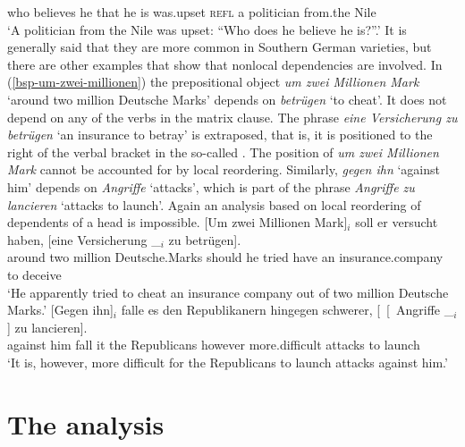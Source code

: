      \hphantom{"`}who believes he that he {} is was.upset \textsc{refl} a politician from.the Nile\\
\glt `A politician from the Nile was upset: ``Who does he believe he is?''.'
\zl
It is generally said that they are more common in Southern German varieties, but there are other
examples that show that nonlocal dependencies are involved. In (\ref{bsp-um-zwei-millionen}) the
prepositional object \emph{um zwei Millionen Mark} `around two million Deutsche Marks' depends on
\emph{betrügen} `to cheat'. It does not
depend on any of the verbs in the matrix clause. The phrase \emph{eine Versicherung zu betrügen} `an
insurance to betray' is extraposed, that is, it is positioned to the right of the verbal bracket in the so-called \nf. The
position of \emph{um zwei Millionen Mark} cannot be accounted for by local reordering. Similarly,
\emph{gegen ihn} `against him' depends on \emph{Angriffe} `attacks', which is part of the phrase \emph{Angriffe zu
  lancieren} `attacks to launch'. Again an analysis based on local reordering of dependents of a head is impossible.
\eal
\label{bsp-Fernabhaengigkeit}
\ex\label{bsp-um-zwei-millionen}
\gll {}[Um zwei Millionen Mark]$_i$ soll er versucht haben, [eine Versicherung \_$_i$ zu betrügen].\footnotemark\\
       \spacebr{}around two million Deutsche.Marks should he tried have \spacebr{}an insurance.company {} to deceive\\\german
{}
\glt `He apparently tried to cheat an insurance company out of two million Deutsche Marks.'
\ex
\gll {}[Gegen ihn]$_i$ falle es den Republikanern hingegen schwerer, [~[~Angriffe \_$_i$] zu lancieren].\footnotemark\\
	 {}\spacebr{}against him fall it the Republicans however more.difficult \hphantom{[~[~}attacks {} to launch\\
\glt `It is, however, more difficult for the Republicans to launch attacks against him.'
\zl



\section{The analysis}
\label{sec-analysis-verb-mevement}

